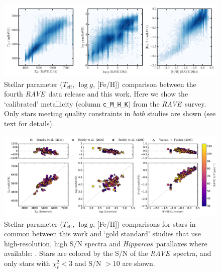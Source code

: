 \documentclass[preprint,trackchanges]{aastex}
\newcommand{\acronym}[1]{{\small{#1}}}
\newcommand{\project}[1]{\textsl{#1}}
\newcommand{\rave}{\project{\acronym{RAVE}}}
\newcommand{\hipparcos}{\project{Hipparcos}}
\newcommand{\teff}{T_{\mathrm{eff}}}
\newcommand{\logg}{\log g}
\begin{document}
\begin{figure}[p]
\includegraphics[width=\textwidth]{figures/dr4-comparison.pdf}
\caption{Stellar parameter ($\teff$, $\logg$, [Fe/H]) comparison between the fourth \rave\ data release \citep{Kordopatis_2013} and this work. Here we show the `calibrated' metallicity (column \texttt{c\_M\_H\_K}) from the \rave\ survey. Only stars meeting quality constraints in \emph{both} studies are shown (see text for details).\label{fig:rave-dr4-comparison}}
\end{figure}


\begin{figure}[p]
\includegraphics[width=\textwidth]{figures/gold-standard-comparison.pdf}
\caption{Stellar parameter ($\teff$, $\logg$, [Fe/H]) comparisons for stars in common between this work and `gold standard' studies that use high-resolution, high S/N spectra and \hipparcos\ parallaxes where available: \citet{Bensby_2014,Reddy_2003,Reddy_2006,Valenti_Fischer_2005}. Stars are colored by the S/N of the \rave\ spectra, and only stars with $\chi_r^2 < 3$ and S/N $> 10$ are shown.  \label{fig:gold-standard-comparison}}
\end{figure}
\end{document}

